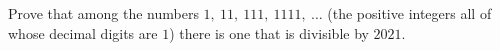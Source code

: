 Prove that among the numbers $1,\ 11,\ 111,\ 1111,\ \dots$ (the positive integers all of whose decimal digits are $1$) there is one that is divisible by $2021$.
